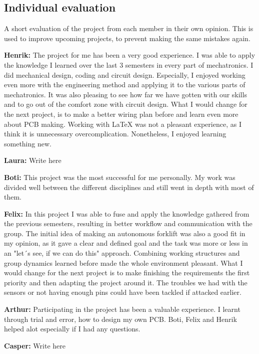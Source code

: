 \documentclass[../report.tex]{subfiles}
\begin{document}
\subsection{Individual evaluation}
A short evaluation of the project from each member in their own opinion. This is used to improve
upcoming projects, to prevent making the same mistakes again.

\textbf{Henrik:}
The project for me has been a very good experience. I was able to apply the knowledge
I learned over the last 3 semesters in every part of mechatronics. I did mechanical
design, coding and circuit design. Especially, I enjoyed working even more
with the engineering method and applying it to the various parts of mechatronics. 
It was also pleasing to see how far we have gotten with our skills and to go out of the comfort zone with circuit design. What I would change for the
next project, is to make a better wiring plan before and learn even more about PCB making.
Working with LaTeX was not a pleasant
experience, as I think it is unnecessary overcomplication. Nonetheless, I enjoyed learning something new.


\textbf{Laura:}
Write here

\textbf{Boti:}
This project was the most successful for me personally. My work was divided well between the different disciplines
and still went in depth with most of them.

\textbf{Felix:}
In this project I was able to fuse and apply the knowledge gathered from the previous semesters, resulting in better 
workflow and communication with the group. The initial idea of making an autonomous forklift was also a good fit 
in my opinion, as it gave a clear and defined goal and the task was more or less in an "let´s see, if we can do this" 
approach. Combining working structures and group dynamics learned before made the whole environment pleasant.  What I would 
change for the next project is to make finishing the requirements the first priority and then adapting the project around it. 
The troubles we had with the sensors or not having enough pins could have been tackled if attacked earlier.



\textbf{Arthur:}
Participating in the project has been a valuable experience. I learnt through trial and error, how to design my own PCB. Boti, Felix and Henrik helped alot especially if I had any questions. 


\textbf{Casper:}
Write here
\end{document}
